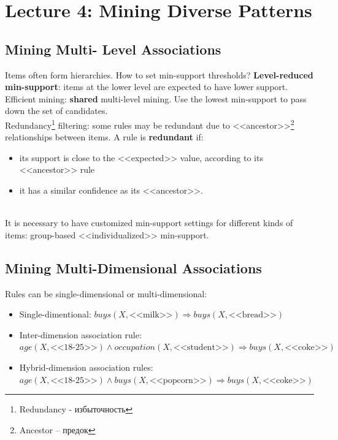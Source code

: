 \section{Lecture 4: Mining Diverse Patterns}

\subsection{Mining Multi- Level Associations}

Items often form hierarchies. How to set min-support thresholds? \textbf{Level-reduced min-support}: items at the lower level are expected to have lower support.\\

Efficient mining: \textbf{shared} multi-level mining. Use the lowest min-support to pass down the set of candidates.\\

Redundancy\footnote{Redundancy - избыточность} filtering: some rules may be redundant due to <<ancestor>>\footnote{Ancestor -- предок} relationships between items. A rule is \textbf{redundant} if:
\begin{itemize}
\item its support is close to the <<expected>> value, according to its <<ancestor>> rule
\item it has a similar confidence as its <<ancestor>>.
\end{itemize}\\

It is necessary to have customized min-support settings for different kinds of items: group-based <<individualized>> min-support.

\subsection{Mining Multi-Dimensional Associations}
Rules can be single-dimensional or multi-dimensional:
\begin{itemize}
\item Single-dimentional: $buys(X, \text{<<milk>>}) \Rightarrow buys(X, \text{<<bread>>})$
\item Inter-dimension association rule: $age(X, \text{<<18-25>>}) \wedge occupation(X, \text{<<student>>}) \Rightarrow buys(X, \text{<<coke>>})$ \item Hybrid-dimension association rules: $age(X, \text{<<18-25>>}) \wedge buys(X, \text{<<popcorn>>}) \Rightarrow buys(X, \text{<<coke>>})$
\end{itemize}


